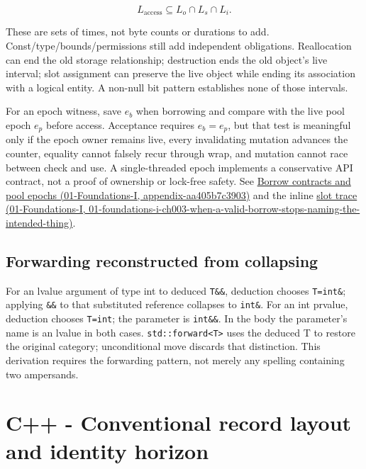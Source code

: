 \[
L_{\mathrm{access}}\subseteq L_o\cap L_s\cap L_i.
\]

These are sets of times, not byte counts or durations to add. Const/type/bounds/permissions still add independent obligations. Reallocation can end the old storage relationship; destruction ends the old object's live interval; slot assignment can preserve the live object while ending its association with a logical entity. A non-null bit pattern establishes none of those intervals.

For an epoch witness, save \(e_b\) when borrowing and compare with the live pool epoch \(e_p\) before access. Acceptance requires \(e_b=e_p\), but that test is meaningful only if the epoch owner remains live, every invalidating mutation advances the counter, equality cannot falsely recur through wrap, and mutation cannot race between check and use. A single-threaded epoch implements a conservative API contract, not a proof of ownership or lock-free safety. See \href{../01-Foundations-I/main.pdf\#nameddest=appendix-aa405b7c3903}{Borrow contracts and pool epochs (01-Foundations-I, appendix-aa405b7c3903)} and the inline \href{../01-Foundations-I/main.pdf\#nameddest=01-foundations-i-ch003-when-a-valid-borrow-stops-naming-the-intended-thing}{slot trace (01-Foundations-I, 01-foundations-i-ch003-when-a-valid-borrow-stops-naming-the-intended-thing)}.

\subsection{Forwarding reconstructed from collapsing}\label{03-visual-computing-i-ch018-forwarding-reconstructed-from-collapsing}

For an lvalue argument of type int to deduced \texttt{T\&\&}, deduction chooses \texttt{T=int\&}; applying \texttt{\&\&} to that substituted reference collapses to \texttt{int\&}. For an int prvalue, deduction chooses \texttt{T=int}; the parameter is \texttt{int\&\&}. In the body the parameter's name is an lvalue in both cases. \texttt{std::forward\textless{}T\textgreater{}} uses the deduced T to restore the original category; unconditional move discards that distinction. This derivation requires the forwarding pattern, not merely any spelling containing two ampersands.

\section{C++ - Conventional record layout and identity horizon}\label{03-visual-computing-i-ch018-c---conventional-record-layout-and-identity-horizon}

